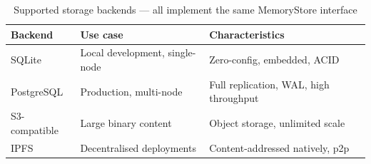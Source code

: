 \begin{table}[H]
\centering
\renewcommand{\arraystretch}{1.4}
\begin{tabularx}{\textwidth}{@{}llX@{}}
\toprule
\textbf{Backend} & \textbf{Use case} & \textbf{Characteristics} \\
\midrule
SQLite       & Local development, single-node & Zero-config, embedded, ACID \\
PostgreSQL   & Production, multi-node         & Full replication, WAL, high throughput \\
S3-compatible & Large binary content           & Object storage, unlimited scale \\
IPFS         & Decentralised deployments      & Content-addressed natively, p2p \\
\bottomrule
\end{tabularx}
\caption{Supported storage backends — all implement the same MemoryStore interface}
\end{table}
